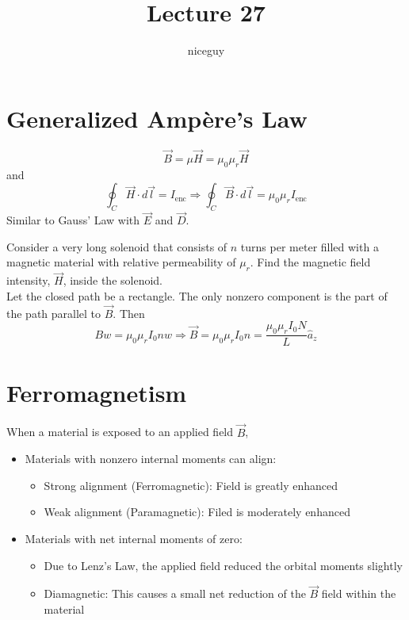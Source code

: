 \documentclass[12pt]{article}
\author{niceguy}
\title{Lecture 27}
\begin{document}
\maketitle

\section{Generalized Amp\`ere's Law}

$$\vec B = \mu \vec H = \mu_0\mu_r \vec H$$
and
$$\oint_C \vec H \cdot d\vec l = I_{\text{enc}} \Rightarrow \oint_C \vec B \cdot d\vec l = \mu_0\mu_r I_{\text{enc}}$$
Similar to Gauss' Law with $\vec E$ and $\vec D$.

\begin{ex}
	Consider a very long solenoid that consists of $n$ turns per meter filled with a magnetic material with relative permeability of $\mu_r$. Find the magnetic field intensity, $\vec H$, inside the solenoid. \\
	Let the closed path be a rectangle. The only nonzero component is the part of the path parallel to $\vec B$. Then
	$$Bw = \mu_0\mu_rI_0nw \Rightarrow \vec B = \mu_0\mu_r I_0n = \frac{\mu_0\mu_rI_0N}{L}\hat a_z$$
\end{ex}

\section{Ferromagnetism}

When a material is exposed to an applied field $\vec B$,

\begin{itemize}
	\item Materials with nonzero internal moments can align:
	\begin{itemize}
		\item Strong alignment (Ferromagnetic): Field is greatly enhanced
		\item Weak alignment (Paramagnetic): Filed is moderately enhanced
	\end{itemize}
	\item Materials with net internal moments of zero:
	\begin{itemize}
		\item Due to Lenz's Law, the applied field reduced the orbital moments slightly
		\item Diamagnetic: This causes a small net reduction of the $\vec B$ field within the material
	\end{itemize}
\end{itemize}
\end{document}

